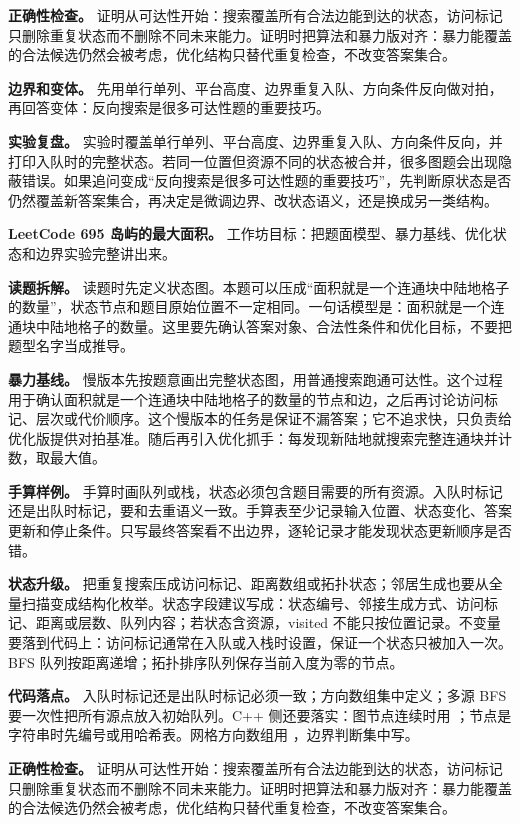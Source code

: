 \textbf{正确性检查。} 证明从可达性开始：搜索覆盖所有合法边能到达的状态，访问标记只删除重复状态而不删除不同未来能力。证明时把算法和暴力版对齐：暴力能覆盖的合法候选仍然会被考虑，优化结构只替代重复检查，不改变答案集合。

\textbf{边界和变体。} 先用单行单列、平台高度、边界重复入队、方向条件反向做对拍，再回答变体：反向搜索是很多可达性题的重要技巧。

\textbf{实验复盘。} 实验时覆盖单行单列、平台高度、边界重复入队、方向条件反向，并打印入队时的完整状态。若同一位置但资源不同的状态被合并，很多图题会出现隐蔽错误。如果追问变成“反向搜索是很多可达性题的重要技巧”，先判断原状态是否仍然覆盖新答案集合，再决定是微调边界、改状态语义，还是换成另一类结构。

\noindent\textbf{LeetCode 695 岛屿的最大面积。} 工作坊目标：把题面模型、暴力基线、优化状态和边界实验完整讲出来。

\textbf{读题拆解。} 读题时先定义状态图。本题可以压成“面积就是一个连通块中陆地格子的数量”，状态节点和题目原始位置不一定相同。一句话模型是：面积就是一个连通块中陆地格子的数量。这里要先确认答案对象、合法性条件和优化目标，不要把题型名字当成推导。

\textbf{暴力基线。} 慢版本先按题意画出完整状态图，用普通搜索跑通可达性。这个过程用于确认面积就是一个连通块中陆地格子的数量的节点和边，之后再讨论访问标记、层次或代价顺序。这个慢版本的任务是保证不漏答案；它不追求快，只负责给优化版提供对拍基准。随后再引入优化抓手：每发现新陆地就搜索完整连通块并计数，取最大值。

\textbf{手算样例。} 手算时画队列或栈，状态必须包含题目需要的所有资源。入队时标记还是出队时标记，要和去重语义一致。手算表至少记录输入位置、状态变化、答案更新和停止条件。只写最终答案看不出边界，逐轮记录才能发现状态更新顺序是否错。

\textbf{状态升级。} 把重复搜索压成访问标记、距离数组或拓扑状态；邻居生成也要从全量扫描变成结构化枚举。状态字段建议写成：状态编号、邻接生成方式、访问标记、距离或层数、队列内容；若状态含资源，visited 不能只按位置记录。不变量要落到代码上：访问标记通常在入队或入栈时设置，保证一个状态只被加入一次。BFS 队列按距离递增；拓扑排序队列保存当前入度为零的节点。

\textbf{代码落点。} 入队时标记还是出队时标记必须一致；方向数组集中定义；多源 BFS 要一次性把所有源点放入初始队列。C++ 侧还要落实：图节点连续时用 ；节点是字符串时先编号或用哈希表。网格方向数组用 ，边界判断集中写。

\textbf{正确性检查。} 证明从可达性开始：搜索覆盖所有合法边能到达的状态，访问标记只删除重复状态而不删除不同未来能力。证明时把算法和暴力版对齐：暴力能覆盖的合法候选仍然会被考虑，优化结构只替代重复检查，不改变答案集合。


